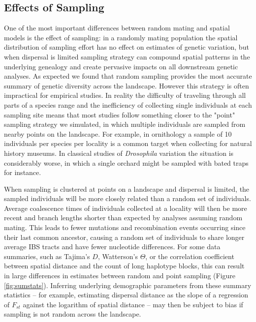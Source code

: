 \documentclass[11pt,twoside,lineno]{preprint}
\begin{document}
\subsection{Effects of Sampling}
One of the most important differences between random mating and spatial models is the effect of sampling: in a randomly mating population the spatial distribution of sampling effort has no effect on estimates of genetic variation, but when dispersal is limited sampling strategy can compound spatial patterns in the underlying genealogy and create pervasive impacts on all downstream genetic analyses. As expected we found that random sampling provides the most accurate summary of genetic diversity across the landscape. However this strategy is often impractical for empirical studies. In reality the difficulty of traveling through all parts of a species range and the inefficiency of collecting single individuals at each sampling site means that most studies follow something closer to the "point" sampling strategy we simulated, in which multiple individuals are sampled from nearby points on the landscape. For example, in ornithology a sample of 10 individuals per species per locality is a common target when collecting for natural history museums. In classical studies of \textit{Drosophila} variation the situation is considerably worse, in which a single orchard might be sampled with bated traps for instance. 

When sampling is clustered at points on a landscape and dispersal is limited, the sampled individuals will be more closely related than a random set of individuals. Average coalescence times of individuals collected at a locality will then be more recent and branch lengths shorter than expected by analyses assuming random mating. This leads to fewer mutations and recombination events occurring since their last common ancestor, causing a random set of individuals to share longer average IBS tracts and have fewer nucleotide differences. For some data summaries, such as Tajima's $D$, Watterson's $\Theta$, or the correlation coefficient between spatial distance and the count of long haplotype blocks, this can result in large differences in estimates between random and point sampling (Figure \ref{fig:sumstats}). Inferring underlying demographic parameters from these summary statistics -- for example, estimating dispersal distance as the slope of a regression of $F_{st}$ against the logarithm of spatial distance \citep{Rousset1997} -- may then be subject to bias if sampling is not random across the landscape. 
\end{document}
